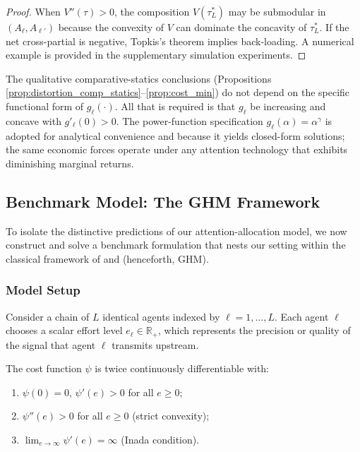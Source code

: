 \begin{proof}
When $V''(\tau) > 0$, the composition $V(\tau^*_L)$ may be submodular in $(A_\ell, A_{\ell'})$ because the convexity of $V$ can dominate the concavity of $\tau^*_L$. If the net cross-partial is negative, Topkis's theorem implies back-loading. A numerical example is provided in the supplementary simulation experiments.
\end{proof}

\begin{remark}
The qualitative comparative-statics conclusions (Propositions \ref{prop:distortion_comp_statics}--\ref{prop:cost_min}) do not depend on the specific functional form of $g_\ell(\cdot)$. All that is required is that $g_\ell$ be increasing and concave with $g'_\ell(0) > 0$. The power-function specification $g_\ell(\alpha) = \alpha^\gamma$ is adopted for analytical convenience and because it yields closed-form solutions; the same economic forces operate under any attention technology that exhibits diminishing marginal returns.
\end{remark}

\subsection{Benchmark Model: The GHM Framework}
\label{sec:GHM_benchmark}

To isolate the distinctive predictions of our attention-allocation model, we now construct and solve a benchmark formulation that nests our setting within the classical framework of \citet{garicano2000hierarchies} and \citet{holmstrom1991multitask} (henceforth, GHM).

\subsubsection{Model Setup}

Consider a chain of $L$ identical agents indexed by $\ell = 1, \dots, L$. Each agent $\ell$ chooses a scalar effort level $e_\ell \in \mathbb{R}_+$, which represents the precision or quality of the signal that agent $\ell$ transmits upstream.

\begin{assumption}\label{ass:GHM_cost}
The cost function $\psi$ is twice continuously differentiable with:
\begin{enumerate}[label=(\roman*)]
\item $\psi(0) = 0$, $\psi'(e) > 0$ for all $e \geq 0$;
\item $\psi''(e) > 0$ for all $e \geq 0$ (strict convexity);
\item $\lim_{e \to \infty} \psi'(e) = \infty$ (Inada condition).
\end{enumerate}
\end{assumption}

